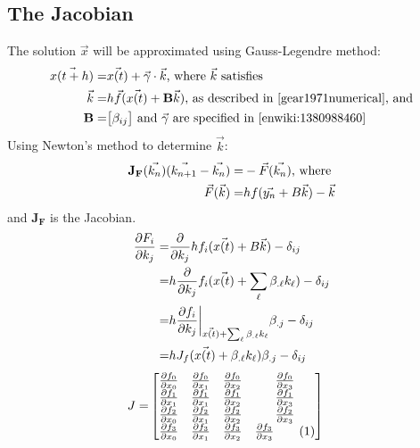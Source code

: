 \documentclass[]{article}
\newcommand\numberthis{\addtocounter{equation}{1}\tag{\theequation}}
\begin{document}
\subsection{The Jacobian}

The solution $\vec{x}$ will be approximated using Gauss-Legendre method\cite{enwiki:1380988460}:
\begin{align*}
		\vec{x(t+h)} =& \vec{x(t)} + \vec{\gamma} \cdot \vec{k} \text{, where $\vec{k}$ satisfies}\\
		\vec{k} =& h \vec{f} (\vec{x(t)} + \mathbf{B} \vec{k}) \text{, as described in \cite{gear1971numerical}, and}\\
		 \mathbf{B}=&\big[\beta_{ij}\big] \text{ and $\vec{\gamma}$ are specified in \cite{enwiki:1380988460}}
\end{align*}
Using Newton's method\cite{enwiki:1380778120} to determine $\vec{k}$: 
\begin{align*}
	\mathbf{J_F}(\vec{k_n})(\vec{k_{n+1}}-\vec{k_n}) =& -\vec{F}(\vec{k_n}) \text{, where}\\
	\vec{F}(\vec{k}) =& hf(\vec{y_n} + \boldmath{B} \vec{k}) -	\vec{k}
\end{align*}
and $\mathbf{J_F}$ is the Jacobian.
\begin{align*}
	\frac{\partial F_i}{\partial k_j} =& \frac{\partial}{\partial k_j}hf_i(\vec{x(t)} + \boldmath{B} \vec{k}) -\delta_{ij}\\
	=& h \frac{\partial}{\partial k_j} f_i(\vec{x(t)} + \sum_{\ell} \beta_{.\ell} k_{\ell}) -\delta_{ij}\\
	=& h \frac{\partial f_i}{\partial k_j}\bigg|_{\vec{x(t)} + \sum_{\ell} \beta_{.\ell} k_{\ell}}\beta_{.j} - \delta_{ij}\\
	=& h J_f(\vec{x(t)} + \beta_{.\ell} k_{\ell})\beta_{.j} - \delta_{ij}
\end{align*}
\begin{align*}
	J =& \begin{bmatrix}
		\frac{\partial f_0}{\partial x_0}&\frac{\partial f_0}{\partial x_1}&\frac{\partial f_0}{\partial x_2}&\frac{\partial f_0}{\partial x_3}\\
		\frac{\partial f_1}{\partial x_1}&\frac{\partial f_1}{\partial x_1}&\frac{\partial f_1}{\partial x_2}&\frac{\partial f_1}{\partial x_3}\\
		\frac{\partial f_2}{\partial x_0}&\frac{\partial f_2}{\partial x_1}&\frac{\partial f_2}{\partial x_2}&\frac{\partial f_2}{\partial x_3}\\
		\frac{\partial f_3}{\partial x_0}&\frac{\partial f_3}{\partial x_1}&\frac{\partial f_3}{\partial x_2}&\frac{\partial f_3}{\partial x_3} \numberthis \label{eq:Jacobian}
	\end{bmatrix}
\end{align*}
\end{document}
